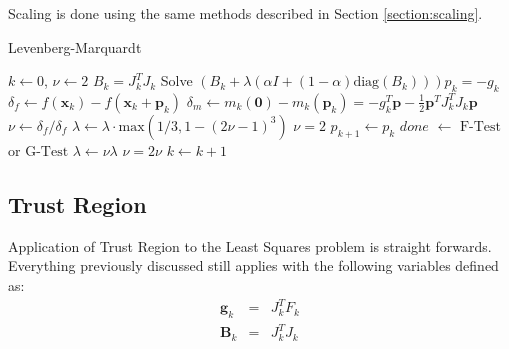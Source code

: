 \documentclass[peerreview,compsoc,onecolumn]{IEEEtran}
\begin{document}
Scaling is done using the same methods described in Section \ref{section:scaling}.

\begin{algorithm}{}
\caption{\label{alg:levenberg_marquardt}Levenberg-Marquardt}
\begin{algorithmic}[1]
	\State $k \gets 0$, $\nu \gets 2$
  	\State $B_k = J_k^T J_k$
		\State Solve $\left(B_k + \lambda \left(\alpha I + (1-\alpha)\mbox{diag}(B_k) \right)\right) p_k = -g_k$ 
		\State $\delta_f \gets f(\bm{x}_k) - f(\bm{x}_k + \bm{p}_k)$ 
		\State $\delta_m \gets m_k(\bm{0})-m_k(\bm{p}_k) = -g^T_k \bm{p} - \frac{1}{2}\bm{p}^T J_k^T J_k \bm{p}$ 
		\State $\nu \gets \delta_f / \delta_f$  
		 
			\State $\lambda \gets \lambda \cdot \mbox{max}(1/3 , 1-(2\nu-1)^3)$
			\State $\nu = 2$
			\State $p_{k+1} \gets p_k$
			\State $done$ $\gets$ $\mbox{F-Test}$ or $\mbox{G-Test}$ 
		\Else
			\State $\lambda \gets \nu \lambda$ 
			\State $\nu = 2\nu$
		\EndIf
		\State $k \gets k + 1$
	\EndWhile
\end{algorithmic}
\end{algorithm}


\subsection{Trust Region}

Application of Trust Region to the Least Squares problem is straight forwards. Everything previously discussed still applies with the following variables defined as:
\begin{eqnarray}
\bm{g}_k &=& J^T_k F_k  \\
\bm{B}_k &=& J_k^T J_k
\end{eqnarray}



\end{document}
